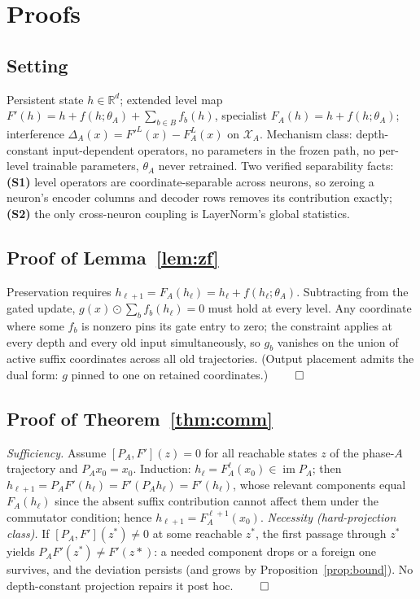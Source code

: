 \documentclass[11pt]{article}
\theoremstyle{remark}\newtheorem{remark}{Remark}
\begin{document}
\appendix

\section{Proofs}\label{app:proofs}

\subsection{Setting}
Persistent state $h\in\mathbb{R}^d$; extended level map
$F'(h)=h+f(h;\theta_A)+\sum_{b\in B}f_b(h)$, specialist $F_A(h)=h+f(h;\theta_A)$;
interference $\Delta_A(x)=F'^L(x)-F_A^L(x)$ on $\mathcal{X}_A$. Mechanism class:
depth-constant input-dependent operators, no parameters in the frozen path, no per-level
trainable parameters, $\theta_A$ never retrained. Two verified separability facts:
\textbf{(S1)} level operators are coordinate-separable across neurons, so zeroing a
neuron's encoder columns and decoder rows removes its contribution exactly;
\textbf{(S2)} the only cross-neuron coupling is LayerNorm's global statistics.

\subsection{Proof of Lemma~\ref{lem:zf}}
Preservation requires $h_{\ell+1}=F_A(h_\ell)=h_\ell+f(h_\ell;\theta_A)$. Subtracting from
the gated update, $g(x)\odot\sum_b f_b(h_\ell)=0$ must hold at every level. Any coordinate
where some $f_b$ is nonzero pins its gate entry to zero; the constraint applies at every
depth and every old input simultaneously, so $g_b$ vanishes on the union of active suffix
coordinates across all old trajectories. (Output placement admits the dual form: $g$
pinned to one on retained coordinates.) \hfill$\qed$

\subsection{Proof of Theorem~\ref{thm:comm}}
\emph{Sufficiency.} Assume $[P_A,F'](z)=0$ for all reachable states $z$ of the phase-$A$
trajectory and $P_Ax_0=x_0$. Induction: $h_\ell=F_A^\ell(x_0)\in\operatorname{im}P_A$; then
$h_{\ell+1}=P_AF'(h_\ell)=F'(P_Ah_\ell)=F'(h_\ell)$, whose relevant components equal
$F_A(h_\ell)$ since the absent suffix contribution cannot affect them under the commutator
condition; hence $h_{\ell+1}=F_A^{\ell+1}(x_0)$.
\emph{Necessity (hard-projection class).} If $[P_A,F'](z^*)\neq0$ at some reachable $z^*$,
the first passage through $z^*$ yields $P_AF'(z^*)\neq F'(z*)$: a needed component drops or
a foreign one survives, and the deviation persists (and grows by
Proposition~\ref{prop:bound}). No depth-constant projection repairs it post hoc.
\hfill$\qed$
\end{document}
